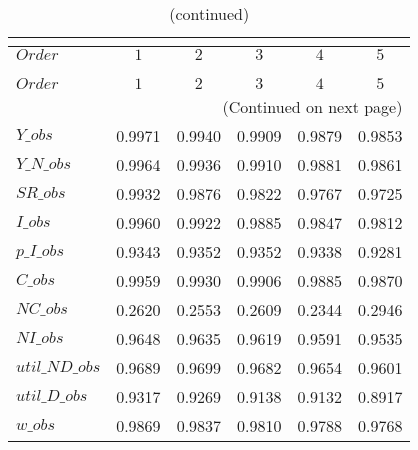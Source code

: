  
\begin{center}
\begin{longtable}{lccccc} 
\caption{COEFFICIENTS OF AUTOCORRELATION}\\
 \label{Table:th_autocorr_matrix}\\
\toprule 
$Order          $	 & 	 $         1$	 & 	 $         2$	 & 	 $         3$	 & 	 $         4$	 & 	 $         5$\\
\midrule \endfirsthead 
\caption{(continued)}\\
 \toprule \\ 
$Order          $	 & 	 $         1$	 & 	 $         2$	 & 	 $         3$	 & 	 $         4$	 & 	 $         5$\\
\midrule \endhead 
\midrule \multicolumn{6}{r}{(Continued on next page)} \\ \bottomrule \endfoot 
\bottomrule \endlastfoot 
$Y\_obs         $	 & 	    0.9971	 & 	    0.9940	 & 	    0.9909	 & 	    0.9879	 & 	    0.9853 \\ 
$Y\_N\_obs      $	 & 	    0.9964	 & 	    0.9936	 & 	    0.9910	 & 	    0.9881	 & 	    0.9861 \\ 
$SR\_obs        $	 & 	    0.9932	 & 	    0.9876	 & 	    0.9822	 & 	    0.9767	 & 	    0.9725 \\ 
$I\_obs         $	 & 	    0.9960	 & 	    0.9922	 & 	    0.9885	 & 	    0.9847	 & 	    0.9812 \\ 
$p\_I\_obs      $	 & 	    0.9343	 & 	    0.9352	 & 	    0.9352	 & 	    0.9338	 & 	    0.9281 \\ 
$C\_obs         $	 & 	    0.9959	 & 	    0.9930	 & 	    0.9906	 & 	    0.9885	 & 	    0.9870 \\ 
$NC\_obs        $	 & 	    0.2620	 & 	    0.2553	 & 	    0.2609	 & 	    0.2344	 & 	    0.2946 \\ 
$NI\_obs        $	 & 	    0.9648	 & 	    0.9635	 & 	    0.9619	 & 	    0.9591	 & 	    0.9535 \\ 
$util\_ND\_obs  $	 & 	    0.9689	 & 	    0.9699	 & 	    0.9682	 & 	    0.9654	 & 	    0.9601 \\ 
$util\_D\_obs   $	 & 	    0.9317	 & 	    0.9269	 & 	    0.9138	 & 	    0.9132	 & 	    0.8917 \\ 
$w\_obs         $	 & 	    0.9869	 & 	    0.9837	 & 	    0.9810	 & 	    0.9788	 & 	    0.9768 \\ 
\end{longtable}
 \end{center}
